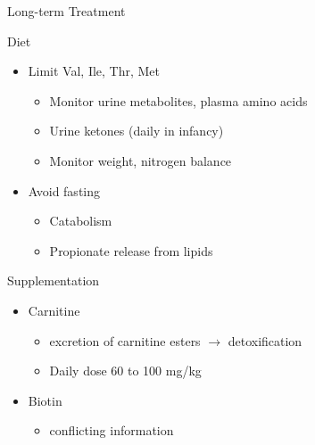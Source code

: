 \documentclass[presentation, smaller]{beamer}
\begin{document}
\begin{frame}[label={sec:orgheadline24}]{Long-term Treatment}
\begin{block}{Diet}
\begin{itemize}
\item Limit Val, Ile, Thr, Met
\begin{itemize}
\item Monitor urine metabolites, plasma amino acids
\item Urine ketones (daily in infancy)
\item Monitor weight, nitrogen balance
\end{itemize}
\item Avoid fasting
\begin{itemize}
\item Catabolism
\item Propionate release from lipids
\end{itemize}
\end{itemize}
\end{block}

\begin{block}{Supplementation}
\begin{itemize}
\item Carnitine
\begin{itemize}
\item excretion of carnitine esters \(\to\) detoxification
\item Daily dose 60 to 100 mg/kg
\end{itemize}
\item Biotin
\begin{itemize}
\item conflicting information
\end{itemize}
\end{itemize}
\end{block}
\end{frame}
\end{document}
